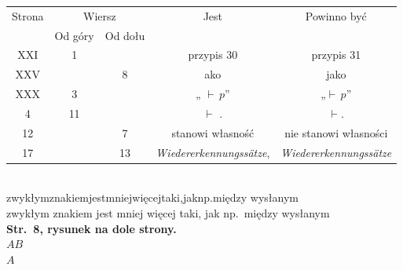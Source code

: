 \documentclass[a4paper,11pt]{article}
\begin{document}
\newpage



\begin{center}

  \begin{tabular}{|c|c|c|c|c|}
    \hline
    Strona & \multicolumn{2}{c|}{Wiersz} & Jest
                              & Powinno być \\ \cline{2-3}
    & Od góry & Od dołu & & \\
    \hline
    XXI & \hphantom{0}1 & & przypis 30 & przypis 31 \\
    XXV & & \hphantom{0}8 & \raisebox{-0.2em}{j}ako & jako \\
    XXX & \hphantom{0}3 & & „ $\vdash \, p$” & „$\vdash \, p$” \\
    \hphantom{0}4 & 11 & & $\vdash$ . & $\vdash$. \\
    12 & & \hphantom{0}7 & stanowi własność
    & nie stanowi własności \\
    17 & & 13 & \textit{Wiedererkennungss\"{a}tze},
    & \textit{Wiedererkennungss\"{a}tze} \\
    \hline
  \end{tabular}

\end{center}

\vspace{\spaceTwo}


\noindent
{} \\
\Jest  zwykłymznakiemjestmniejwięcejtaki,jaknp.między \hspace{-0.5em}
wysłanym \\
\Powin zwykłym znakiem jest mniej więcej taki, jak np.~między wysłanym \\
\textbf{Str.~8, rysunek na dole strony.} \\
\Jest  $AB$ \\
\Powin $A$ \\
\end{document}
